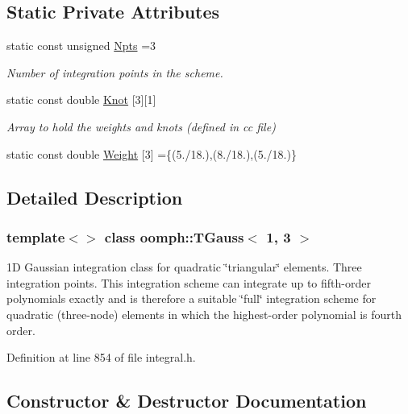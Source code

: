 \subsection*{Static Private Attributes}
\begin{DoxyCompactItemize}
\item 
static const unsigned \hyperlink{classoomph_1_1TGauss_3_011_00_013_01_4_ad3a9885b9b14798d71d0b96c54b0b2f4}{Npts} =3
\begin{DoxyCompactList}\small\item\em Number of integration points in the scheme. \end{DoxyCompactList}\item 
static const double \hyperlink{classoomph_1_1TGauss_3_011_00_013_01_4_a8415e912ca5b1b3ab5201ec155091a90}{Knot} \mbox{[}3\mbox{]}\mbox{[}1\mbox{]}
\begin{DoxyCompactList}\small\item\em Array to hold the weights and knots (defined in cc file) \end{DoxyCompactList}\item 
static const double \hyperlink{classoomph_1_1TGauss_3_011_00_013_01_4_aa2fb3bfed7d3c785b33ca5f55eae9ff0}{Weight} \mbox{[}3\mbox{]} =\{(5./18.),(8./18.),(5./18.)\}
\end{DoxyCompactItemize}


\subsection{Detailed Description}
\subsubsection*{template$<$$>$\newline
class oomph\+::\+T\+Gauss$<$ 1, 3 $>$}

1D Gaussian integration class for quadratic \char`\"{}triangular\char`\"{} elements. Three integration points. This integration scheme can integrate up to fifth-\/order polynomials exactly and is therefore a suitable \char`\"{}full\char`\"{} integration scheme for quadratic (three-\/node) elements in which the highest-\/order polynomial is fourth order. 

Definition at line 854 of file integral.\+h.



\subsection{Constructor \& Destructor Documentation}
\mbox{\label{classoomph_1_1TGauss_3_011_00_013_01_4_aa9ec6fd6d47287b494d931db5d970c6d}} 
